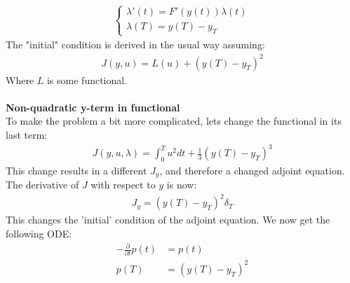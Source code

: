 \documentclass[11pt,a4paper]{report}
\begin{document}
\begin{align*}
\left\{
     \begin{array}{lr}
       	\lambda'(t)=F'(y(t))\lambda(t)\\
       	   \lambda(T)= y(T)-y_T
     \end{array}
   \right.
\end{align*}
The "initial" condition is derived in the usual way assuming: 
\begin{align*}
J(y,u)=L(u) + (y(T)-y_T)^2
\end{align*}
Where $L$ is some functional.
\\
\\
\textbf{Non-quadratic y-term in functional}
\\
To make the problem a bit more complicated, lets change the functional in its last term:
\begin{align*}
J(y,u,\lambda) = \int_0^T u^2 dt + \frac{1}{3}(y(T)-y_T)^3
\end{align*}
This change results in a different $J_y$, and therefore a changed adjoint equation. The derivative of $J$ with respect to $y$ is now:
\begin{align*}
J_y = (y(T)-y_T)^2\delta_T
\end{align*}
This changes the 'initial' condition of the adjoint equation. We now get the following ODE:
\begin{align*}
-\frac{\partial }{\partial t}p(t) &=p(t)  \\
p(T) &= (y(T)-y_T)^2
\end{align*}
\end{document}
